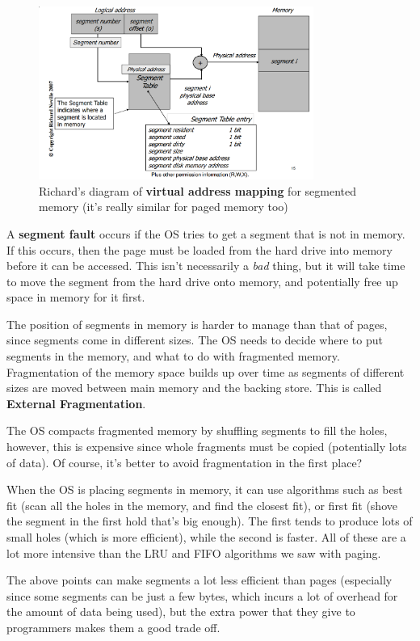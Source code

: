 \begin{figure}[ht!]
  \centering
  \includegraphics[width=90mm]{images/memoryMapping.png}
  \caption{Richard's diagram of \textbf{virtual address mapping} for segmented
  memory (it's really similar for paged memory too)}
  \label{memoryMap}
\end{figure}

A \textbf{segment fault} occurs if the OS tries to get a segment that is not in
memory. If this occurs, then the page must be loaded from the hard drive into
memory before it can be accessed. This isn't necessarily a \textit{bad} thing,
but it will take time to move the segment from the hard drive onto memory, and
potentially free up space in memory for it first.

The position of segments in memory is harder to manage than that of pages, since
segments come in different sizes. The OS needs to decide where to put segments
in the memory, and what to do with fragmented memory. Fragmentation of the
memory space builds up over time as segments of different sizes are moved
between main memory and the backing store. This is called \textbf{External
Fragmentation}.

The OS compacts fragmented memory by shuffling segments to fill the holes,
however, this is expensive since whole fragments must be copied (potentially
lots of data). Of course, it's better to avoid fragmentation in the first place?

When the OS is placing segments in memory, it can use algorithms such as best
fit (scan all the holes in the memory, and find the closest fit), or first fit
(shove the segment in the first hold that's big enough). The first tends to
produce lots of small holes (which is more efficient), while the second is
faster. All of these are a lot more intensive than the LRU and FIFO algorithms
we saw with paging.

The above points can make segments a lot less efficient than pages (especially
since some segments can be just a few bytes, which incurs a lot of overhead for
the amount of data being used), but the extra power that they give to
programmers makes them a good trade off.

